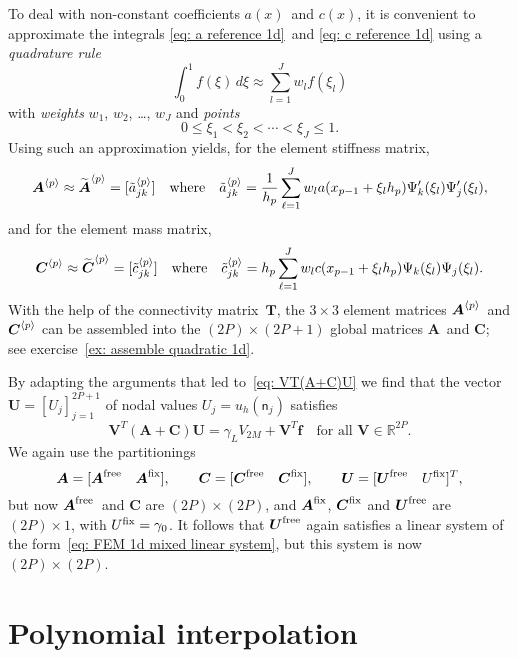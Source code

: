 To deal with non-constant coefficients $a(x)$~and $c(x)$, it is convenient to 
approximate the integrals \eqref{eq: a reference 1d}~and
\eqref{eq: c reference 1d} using a \emph{quadrature rule}
\[
\int_0^1 f(\xi)\,d\xi\approx\sum_{l=1}^J w_lf(\xi_l)
\]
with \emph{weights} $w_1$, $w_2$, \dots, $w_J$ and \emph{points}
\[
0\le\xi_1<\xi_2<\cdots<\xi_J\le1.
\]
Using such an approximation yields, for the element stiffness matrix,
\[
\boldsymbol{A}^{\langle p\rangle}\approx
	\widetilde{\boldsymbol{A}}^{\langle p\rangle}=[\tilde a_{jk}^{\langle p\rangle}]
\quad\text{where}\quad
\tilde a^{\langle p\rangle}_{jk}=\frac{1}{h_p}\sum_{\ell=1}^Jw_la(x_{p-1}+\xi_lh_p)
	\Psi'_k(\xi_l)\Psi'_j(\xi_l),
\]
and for the element mass matrix,
\[
\boldsymbol{C}^{\langle p\rangle}\approx
	\widetilde{\boldsymbol{C}}^{\langle p\rangle}=[\tilde c_{jk}^{\langle p\rangle}]
\quad\text{where}\quad
\tilde c^{\langle p\rangle}_{jk}=h_p\sum_{\ell=1}^Jw_lc(x_{p-1}+\xi_lh_p)
	\Psi_k(\xi_l)\Psi_j(\xi_l).
\]
With the help of the connectivity matrix~$\boldsymbol{T}$, the $3\times3$ 
element matrices $\boldsymbol{A}^{\langle p\rangle}$~and $\boldsymbol{C}^{\langle p\rangle}$ can be 
assembled into the $(2P)\times(2P+1)$ global matrices $\boldsymbol{A}$~and 
$\boldsymbol{C}$; see exercise~\ref{ex: assemble quadratic 1d}.

By adapting the arguments that led to~\eqref{eq: VT(A+C)U} we find that the 
vector~$\boldsymbol{U}=[U_j]_{j=1}^{2P+1}$ of nodal values 
$U_j=u_h(\mathsf{n}_j)$ satisfies
\[
\boldsymbol{V}^T(\boldsymbol{A}+\boldsymbol{C})\boldsymbol{U}
	=\gamma_LV_{2M}+\boldsymbol{V}^T\boldsymbol{f}
	\quad\text{for all $\boldsymbol{V}\in\mathbb{R}^{2P}$.}
\]
We again use the partitionings
\[
\boldsymbol{A}=[\boldsymbol{A}^{\mathrm{free}}\quad\boldsymbol{A}^{\mathrm{fix}}],\qquad
\boldsymbol{C}=[\boldsymbol{C}^{\mathrm{free}}\quad\boldsymbol{C}^{\mathrm{fix}}],\qquad
\boldsymbol{U}=[\boldsymbol{U}^{\mathrm{free}}\quad U^{\mathrm{fix}}]^T,
\]
but now $\boldsymbol{A}^{\mathrm{free}}$~and $\boldsymbol{C}$ are $(2P)\times(2P)$, and
$\boldsymbol{A}^{\mathrm{fix}}$, $\boldsymbol{C}^{\mathrm{fix}}$ and $\boldsymbol{U}^{\mathrm{free}}$ are 
$(2P)\times1$, with $U^{\mathrm{fix}}=\gamma_0$.  It follows that $\boldsymbol{U}^{\mathrm{free}}$ 
again satisfies a linear system of the 
form~\eqref{eq: FEM 1d mixed linear system}, but this system is now 
$(2P)\times(2P)$.

\section{Polynomial interpolation}

